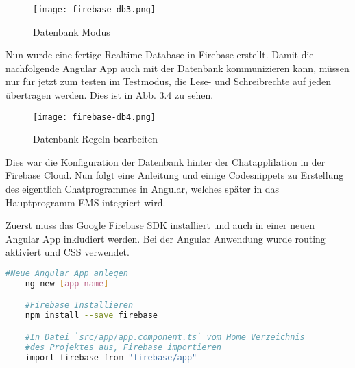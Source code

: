 \begin{center}
    \begin{figure}[H]
        \centering
        \texttt{[image: firebase-db3.png]}
        \caption{Datenbank Modus}
    \end{figure}
\end{center}
Nun wurde eine fertige Realtime Database in Firebase erstellt. Damit die nachfolgende Angular App auch mit der Datenbank kommunizieren kann, müssen nur für jetzt zum testen im Testmodus, die Lese- und Schreibrechte auf
jeden übertragen werden. Dies ist in Abb. 3.4 zu sehen.
\begin{center}
    \begin{figure}[H]
        \centering
        \texttt{[image: firebase-db4.png]}
        \caption{Datenbank Regeln bearbeiten}
    \end{figure}
\end{center}
Dies war die Konfiguration der Datenbank hinter der Chatapplilation in der Firebase Cloud. Nun folgt eine Anleitung und einige Codesnippets zu Erstellung des eigentlich Chatprogrammes in Angular, welches später in das Hauptprogramm
EMS integriert wird.

Zuerst muss das Google Firebase SDK installiert und auch in einer neuen Angular App inkludiert werden. Bei der Angular Anwendung wurde routing aktiviert und CSS verwendet.
\begin{lstlisting}[language=bash]
    #Neue Angular App anlegen
    ng new [app-name]

    #Firebase Installieren
    npm install --save firebase

    #In Datei `src/app/app.component.ts` vom Home Verzeichnis 
    #des Projektes aus, Firebase importieren
    import firebase from "firebase/app"
\end{lstlisting}

